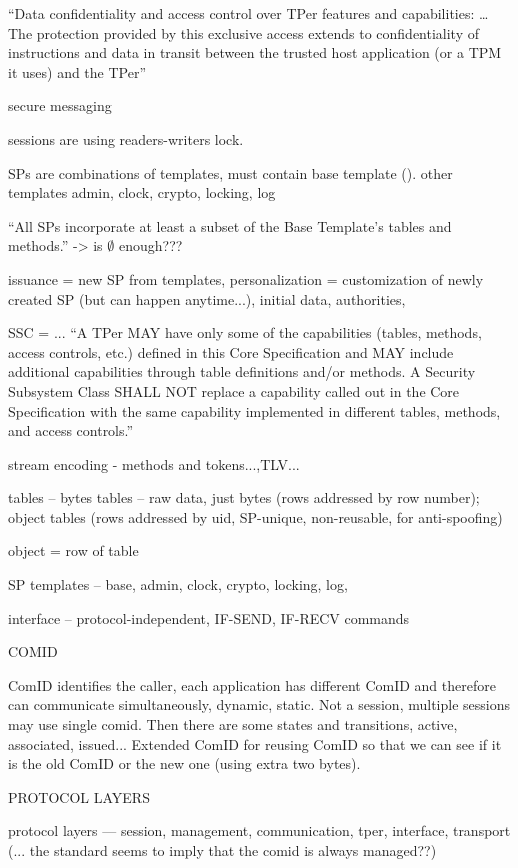 \documentclass[
  digital, %
  oneside, %
  nolof,     %
  nolot,     %
]{fithesis4}
\begin{document}
``Data confidentiality and access control over TPer features and capabilities: \dots The protection provided by this
exclusive access extends to confidentiality of instructions and data in transit between the
trusted host application (or a TPM it uses) and the TPer''


secure messaging

sessions are using readers-writers lock.

SPs are combinations of templates, must contain base template (). other templates admin, clock, crypto, locking, log

``All SPs incorporate at least a subset of the Base Template’s tables and methods.'' -> is $\emptyset$ enough???

issuance = new SP from templates, personalization = customization of newly created SP (but can happen anytime...), initial data, authorities, 

SSC = ... ``A TPer MAY have only some of the capabilities (tables, methods, access controls, etc.) defined in this
Core Specification and MAY include additional capabilities through table definitions and/or methods. A
Security Subsystem Class SHALL NOT replace a capability called out in the Core Specification with the
same capability implemented in different tables, methods, and access controls.''

stream encoding - methods and tokens...,TLV...

tables -- bytes tables -- raw data, just bytes (rows addressed by row number); object tables (rows addressed by uid, SP-unique, non-reusable, for anti-spoofing)

object = row of table

SP templates -- base, admin, clock, crypto, locking, log,


interface -- protocol-independent, IF-SEND, IF-RECV commands 

COMID

ComID identifies the caller, each application has different ComID and therefore can communicate simultaneously, dynamic, static. Not a session, multiple sessions may use single comid. Then there are some states and transitions, active, associated, issued... Extended ComID for reusing ComID so that we can see if it is the old ComID or the new one (using extra two bytes).

PROTOCOL LAYERS

protocol layers --- session, management, communication, tper, interface, transport
(... the standard seems to imply that the comid is always managed??)
\end{document}
